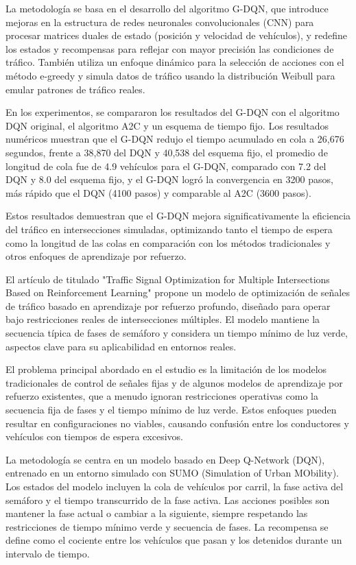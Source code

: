 La metodología se basa en el desarrollo del algoritmo G-DQN, que introduce mejoras en la estructura de redes neuronales convolucionales (CNN) para procesar matrices duales de estado (posición y velocidad de vehículos), y redefine los estados y recompensas para reflejar con mayor precisión las condiciones de tráfico. También utiliza un enfoque dinámico para la selección de acciones con el método e-greedy y simula datos de tráfico usando la distribución Weibull para emular patrones de tráfico reales.

En los experimentos, se compararon los resultados del G-DQN con el algoritmo DQN original, el algoritmo A2C y un esquema de tiempo fijo. Los resultados numéricos muestran que el G-DQN redujo el tiempo acumulado en cola a 26,676 segundos, frente a 38,870 del DQN y 40,538 del esquema fijo, el promedio de longitud de cola fue de 4.9 vehículos para el G-DQN, comparado con 7.2 del DQN y 8.0 del esquema fijo, y el G-DQN logró la convergencia en 3200 pasos, más rápido que el DQN (4100 pasos) y comparable al A2C (3600 pasos).

Estos resultados demuestran que el G-DQN mejora significativamente la eficiencia del tráfico en intersecciones simuladas, optimizando tanto el tiempo de espera como la longitud de las colas en comparación con los métodos tradicionales y otros enfoques de aprendizaje por refuerzo.

El artículo de \cite{Gu2021} titulado "Traffic Signal Optimization for Multiple Intersections Based on Reinforcement Learning" propone un modelo de optimización de señales de tráfico basado en aprendizaje por refuerzo profundo, diseñado para operar bajo restricciones reales de intersecciones múltiples. El modelo mantiene la secuencia típica de fases de semáforo y considera un tiempo mínimo de luz verde, aspectos clave para su aplicabilidad en entornos reales.

El problema principal abordado en el estudio es la limitación de los modelos tradicionales de control de señales fijas y de algunos modelos de aprendizaje por refuerzo existentes, que a menudo ignoran restricciones operativas como la secuencia fija de fases y el tiempo mínimo de luz verde. Estos enfoques pueden resultar en configuraciones no viables, causando confusión entre los conductores y vehículos con tiempos de espera excesivos.

La metodología se centra en un modelo basado en Deep Q-Network (DQN), entrenado en un entorno simulado con SUMO (Simulation of Urban MObility). Los estados del modelo incluyen la cola de vehículos por carril, la fase activa del semáforo y el tiempo transcurrido de la fase activa. Las acciones posibles son mantener la fase actual o cambiar a la siguiente, siempre respetando las restricciones de tiempo mínimo verde y secuencia de fases. La recompensa se define como el cociente entre los vehículos que pasan y los detenidos durante un intervalo de tiempo.

